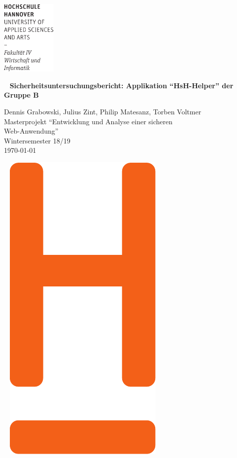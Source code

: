 \documentclass[12pt,DIV14,BCOR10mm,a4paper,parskip=half-,headsepline,headinclude,english,ngerman,bibliography=totocnumbered]{scrreprt}
\begin{document}
  \thispagestyle{empty} %
\includegraphics[width=0.2\textwidth]{Wortmarke_WI_schwarz}

   {  ~ \sffamily
  \vfill
  {\Huge\bfseries Sicherheitsuntersuchungsbericht: Applikation \enquote{HsH-Helper} der Gruppe B}
  \bigskip

  {\Large
  Dennis Grabowski, Julius Zint, Philip Matesanz, Torben Voltmer \\[2ex]
  Masterprojekt \enquote{Entwicklung und Analyse einer sicheren \\Web-Anwendung} \\
  Wintersemester 18/19
 \\[5ex]
   \today }
}
 \vfill

  ~ \hfill
  \includegraphics[height=0.3\paperheight]{H_WI_Pantone1665}
\end{document}
